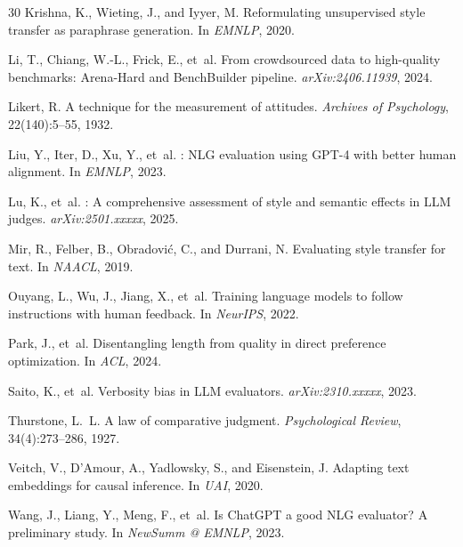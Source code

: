 \documentclass[11pt,a4paper]{article}
\begin{document}
\begin{thebibliography}{30}
Krishna, K., Wieting, J., and Iyyer, M.
\newblock Reformulating unsupervised style transfer as paraphrase generation.
\newblock In \emph{EMNLP}, 2020.

Li, T., Chiang, W.-L., Frick, E., et~al.
\newblock From crowdsourced data to high-quality benchmarks: Arena-Hard and BenchBuilder pipeline.
\newblock \emph{arXiv:2406.11939}, 2024.

Likert, R.
\newblock A technique for the measurement of attitudes.
\newblock \emph{Archives of Psychology}, 22(140):5--55, 1932.

Liu, Y., Iter, D., Xu, Y., et~al.
: {NLG} evaluation using {GPT-4} with better human alignment.
\newblock In \emph{EMNLP}, 2023.

Lu, K., et~al.
: A comprehensive assessment of style and semantic effects in {LLM} judges.
\newblock \emph{arXiv:2501.xxxxx}, 2025.

Mir, R., Felber, B., Obradovi\'{c}, C., and Durrani, N.
\newblock Evaluating style transfer for text.
\newblock In \emph{NAACL}, 2019.

Ouyang, L., Wu, J., Jiang, X., et~al.
\newblock Training language models to follow instructions with human feedback.
\newblock In \emph{NeurIPS}, 2022.

Park, J., et~al.
\newblock Disentangling length from quality in direct preference optimization.
\newblock In \emph{ACL}, 2024.

Saito, K., et~al.
\newblock Verbosity bias in {LLM} evaluators.
\newblock \emph{arXiv:2310.xxxxx}, 2023.

Thurstone, L.~L.
\newblock A law of comparative judgment.
\newblock \emph{Psychological Review}, 34(4):273--286, 1927.

Veitch, V., D'Amour, A., Yadlowsky, S., and Eisenstein, J.
\newblock Adapting text embeddings for causal inference.
\newblock In \emph{UAI}, 2020.

Wang, J., Liang, Y., Meng, F., et~al.
\newblock Is {ChatGPT} a good {NLG} evaluator? {A} preliminary study.
\newblock In \emph{NewSumm @ EMNLP}, 2023.


\end{thebibliography}
\end{document}
